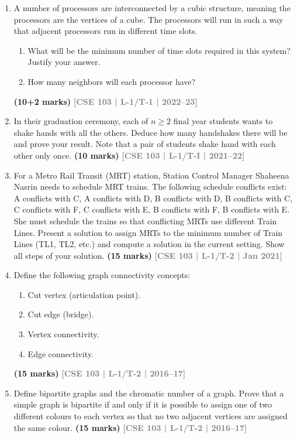 \documentclass[12pt,a3paper]{article}
\newcommand{\yr}[1]{\hfill\textcolor{gray}{\small\textbf{[#1]}}}
\newcommand{\mk}[1]{\textcolor{orange!70!black}{\small\textbf{(#1 marks)}}}
\begin{document}
\begin{enumerate}


\item A number of processors are interconnected by a cubic structure, meaning the processors are the vertices of a cube. The processors will run in such a way that adjacent processors run in different time slots.
\begin{enumerate}
  \item What will be the minimum number of time slots required in this system? Justify your answer.
  \item How many neighbors will each processor have?
\end{enumerate}
\mk{10+2} \yr{CSE 103 | L-1/T-1 | 2022--23}

\item In their graduation ceremony, each of $n \ge 2$ final year students wants to shake hands with all the others. Deduce how many handshakes there will be and prove your result. Note that a pair of students shake hand with each other only once.
\mk{10} \yr{CSE 103 | L-1/T-I | 2021--22}

\item For a Metro Rail Transit (MRT) station, Station Control Manager Shaheena Nasrin needs to schedule MRT trains. The following schedule conflicts exist: A conflicts with C, A conflicts with D, B conflicts with D, B conflicts with C, C conflicts with F, C conflicts with E, B conflicts with F, B conflicts with E. She must schedule the trains so that conflicting MRTs use different Train Lines. Present a solution to assign MRTs to the minimum number of Train Lines (TL1, TL2, etc.) and compute a solution in the current setting. Show all steps of your solution.
\mk{15} \yr{CSE 103 | L-1/T-2 | Jan 2021}

\item Define the following graph connectivity concepts:
\begin{enumerate}
  \item Cut vertex (articulation point).
  \item Cut edge (bridge).
  \item Vertex connectivity.
  \item Edge connectivity.
\end{enumerate}
\mk{15} \yr{CSE 103 | L-1/T-2 | 2016--17}


\item Define bipartite graphs and the chromatic number of a graph. Prove that a simple graph is bipartite if and only if it is possible to assign one of two different colours to each vertex so that no two adjacent vertices are assigned the same colour.
\mk{15} \yr{CSE 103 | L-1/T-2 | 2016--17}


\end{enumerate}
\end{document}
